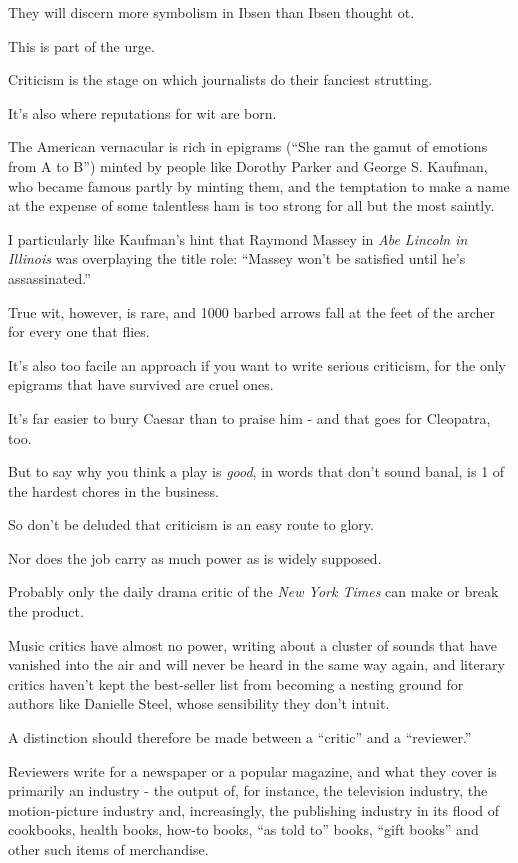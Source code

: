 \documentclass{book}
\numberwithin{equation}{section}
\begin{document}
They will discern more symbolism in Ibsen than Ibsen thought ot.

%
This is part of the urge.

Criticism is the stage on which journalists do their fanciest strutting.

It's also where reputations for wit are born.

The American vernacular is rich in epigrams (``She ran the gamut of emotions from A to B'') minted by people like Dorothy Parker and George S. Kaufman, who became famous partly by minting them, and the temptation to make a name at the expense of some talentless ham is too strong for all but the most saintly.

I particularly like Kaufman's hint that Raymond Massey in \textit{Abe Lincoln in Illinois} was overplaying the title role: ``Massey won't be satisfied until he's assassinated.''

%
True wit, however, is rare, and 1000 barbed arrows fall at the feet of the archer for every one that flies.

It's also too facile an approach if you want to write serious criticism, for the only epigrams that have survived are cruel ones.

It's far easier to bury Caesar than to praise him - and that goes for Cleopatra, too.

But to say why you think a play is \textit{good}, in words that don't sound banal, is 1 of the hardest chores in the business.

%
So don't be deluded that criticism is an easy route to glory.

Nor does the job carry as much power as is widely supposed.

Probably only the daily drama critic of the \textit{New York Times} can make or break the product.

Music critics have almost no power, writing about a cluster of sounds that have vanished into the air and will never be heard in the same way again, and literary critics haven't kept the best-seller list from becoming a nesting ground for authors like Danielle Steel, whose sensibility they don't intuit.

%
A distinction should therefore be made between a ``critic'' and a ``reviewer.''

Reviewers write for a newspaper or a popular magazine, and what they cover is primarily an industry - the output of, for instance, the television industry, the motion-picture industry and, increasingly, the publishing industry in its flood of cookbooks, health books, how-to books, ``as told to'' books, ``gift books'' and other such items of merchandise.
\end{document}
